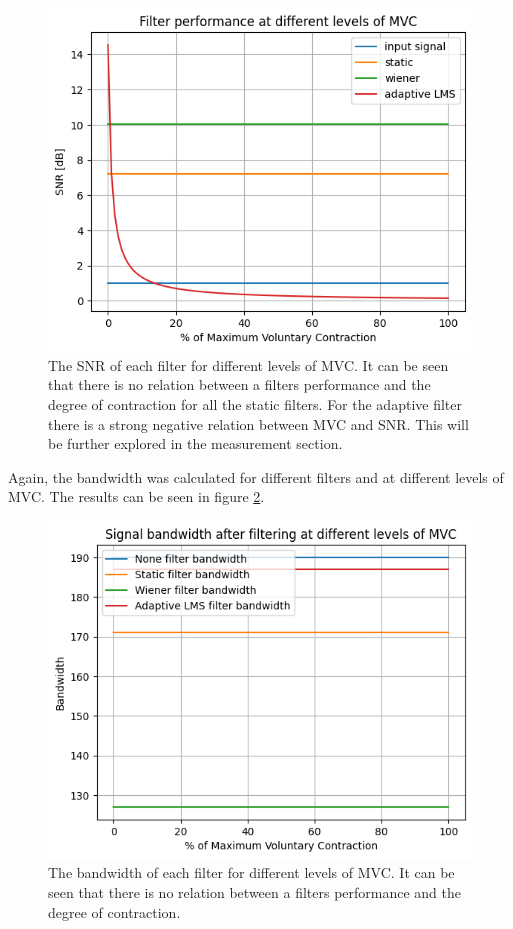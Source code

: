 \begin{figure}[h!t]
	\begin{center}
		\includegraphics[width=0.7\columnwidth]{images/filter_snr_mvc.png}
	\end{center}
	\caption{The SNR of each filter for different levels of MVC. It can be seen that there is no relation between a filters performance and the degree of contraction for all the static filters. For the adaptive filter there is a strong negative relation between MVC and SNR. This will be further explored in the measurement section.}
	\label{fig:filter_snr_mvc}
\end{figure}

Again, the bandwidth was calculated for different filters and at different levels of MVC. The results can be seen in figure \ref{fig:filter_bw_mvc}.

\begin{figure}[h!t]
	\begin{center}
		\includegraphics[width=0.7\columnwidth]{images/filter_bw_mvc.png}
	\end{center}
	\caption{The bandwidth of each filter for different levels of MVC. It can be seen that there is no relation between a filters performance and the degree of contraction. }
	\label{fig:filter_bw_mvc}
\end{figure}

